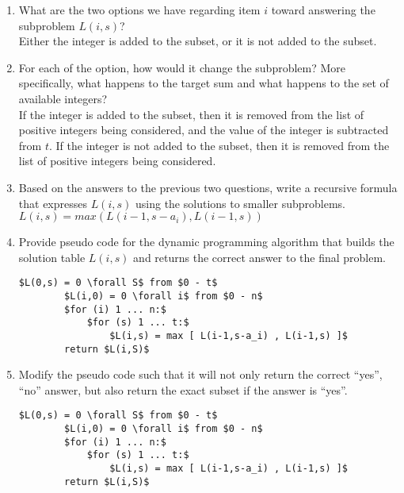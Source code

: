 \documentclass[12pt]{article}
\begin{document}
\begin{enumerate}
    \item What are the two options we have regarding item $i$ toward answering the subproblem $L(i, s)$? \\
        Either the integer is added to the subset, or it is not added to the subset. 

    \item For each of the option, how would it change the subproblem? More
    specifically, what happens to the target sum and what happens to the set
    of available integers? \\
        If the integer is added to the subset, then it is removed from the list of positive integers being considered, and the value of the integer is subtracted from $t$.
        If the integer is not added to the subset, then it is removed from the list of positive integers being considered. 

    \item Based on the answers to the previous two questions, write a
    recursive formula that expresses $L(i, s)$ using the solutions to smaller
    subproblems.  \\
        $L(i, s) = max( L(i-1, s-a_i) , L(i-1, s) )$

    \item Provide pseudo code for the dynamic
    programming algorithm that builds the solution table $L(i, s)$ and returns
    the correct answer to the final problem.  \\

    \begin{lstlisting}[mathescape]
        $L(0,s) = 0 \forall S$ from $0 - t$
        $L(i,0) = 0 \forall i$ from $0 - n$
        $for (i) 1 ... n:$
            $for (s) 1 ... t:$
                $L(i,s) = max [ L(i-1,s-a_i) , L(i-1,s) ]$
        return $L(i,S)$
    \end{lstlisting}
        
    \item Modify the pseudo code such that it will not only return the
    correct “yes”, “no” answer, but also return the exact subset if the
    answer is “yes”. \\

    \begin{lstlisting}[mathescape]
        $L(0,s) = 0 \forall S$ from $0 - t$
        $L(i,0) = 0 \forall i$ from $0 - n$
        $for (i) 1 ... n:$
            $for (s) 1 ... t:$
                $L(i,s) = max [ L(i-1,s-a_i) , L(i-1,s) ]$
        return $L(i,S)$
    \end{lstlisting}

\end{enumerate}
\end{document}
